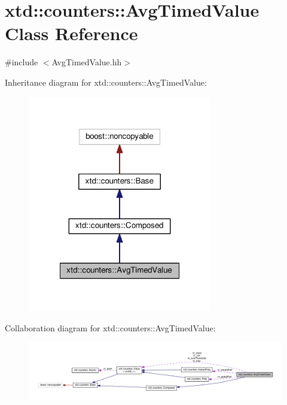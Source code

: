 \hypertarget{classxtd_1_1counters_1_1AvgTimedValue}{\section{xtd\-:\-:counters\-:\-:Avg\-Timed\-Value Class Reference}
\label{classxtd_1_1counters_1_1AvgTimedValue}
}


{\ttfamily \#include $<$Avg\-Timed\-Value.\-hh$>$}



Inheritance diagram for xtd\-:\-:counters\-:\-:Avg\-Timed\-Value\-:
\nopagebreak
\begin{figure}[H]
\begin{center}
\leavevmode
\includegraphics[width=228pt]{classxtd_1_1counters_1_1AvgTimedValue__inherit__graph}
\end{center}
\end{figure}


Collaboration diagram for xtd\-:\-:counters\-:\-:Avg\-Timed\-Value\-:
\nopagebreak
\begin{figure}[H]
\begin{center}
\leavevmode
\includegraphics[width=350pt]{classxtd_1_1counters_1_1AvgTimedValue__coll__graph}
\end{center}
\end{figure}
